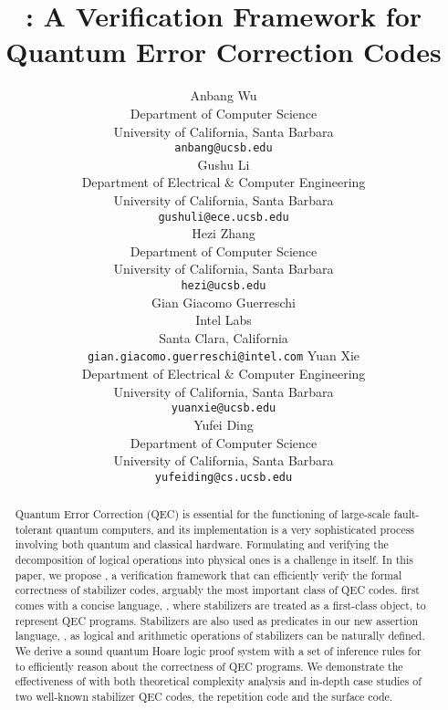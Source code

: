 \documentclass{article}
\title{\myFrameworkName: A Verification Framework for Quantum Error Correction Codes}         %
\author{%
	Anbang Wu \\
	Department of Computer Science\\
	University of California, Santa Barbara \\
	\texttt{anbang@ucsb.edu} \\
	\And
	Gushu Li \\
	Department of Electrical \& Computer Engineering\\
	University of California, Santa Barbara \\
	\texttt{gushuli@ece.ucsb.edu} \\
	\AND
	Hezi Zhang \\
	Department of Computer Science \\
	University of California, Santa Barbara \\
	\texttt{hezi@ucsb.edu} \\
	\AND
	Gian Giacomo Guerreschi \\
	Intel Labs \\
	Santa Clara, California \\
	\texttt{gian.giacomo.guerreschi@intel.com}
	\AND
	Yuan Xie \\
	Department of Electrical \& Computer Engineering\\
	University of California, Santa Barbara \\
	\texttt{yuanxie@ucsb.edu} \\
	\AND
	Yufei Ding \\
	Department of Computer Science\\
	University of California, Santa Barbara \\
	\texttt{yufeiding@cs.ucsb.edu} \\
}
\begin{document}
	
	\maketitle

\begin{abstract}

Quantum Error Correction (QEC) is essential for the functioning of large-scale fault-tolerant quantum computers, and its implementation is a very sophisticated process involving both quantum and classical hardware. Formulating and verifying the decomposition of logical operations into physical ones is a challenge in itself.
In this paper, we propose {\myFrameworkName}, a verification framework that can efficiently verify the formal correctness of stabilizer codes, arguably the most important class of QEC codes.
{\myFrameworkName} first comes with a concise language, {\langname},  where stabilizers are treated as a first-class object, to represent QEC programs.
Stabilizers are also used as predicates in our new assertion language, {\assnname}, as logical and arithmetic operations of stabilizers can be naturally defined.
We derive a sound quantum Hoare logic proof system with a set of inference rules for {\myFrameworkName} to efficiently reason about the correctness of QEC programs.
We demonstrate the effectiveness of {\myFrameworkName} with both theoretical complexity analysis and in-depth case studies of two well-known stabilizer QEC codes, the repetition code and the surface code.

\end{abstract}

\twocolumn











\newpage
\appendix

\end{document}
